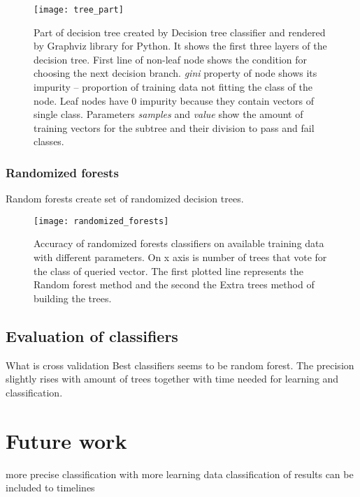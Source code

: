 \begin{figure}
  \centering
  \texttt{[image: tree\_part]}
  \caption{Part of decision tree created by Decision tree classifier and
    rendered by Graphviz library for Python. It shows the first three layers of the
    decision tree. First line of non-leaf node shows the condition for choosing
    the next decision branch. \emph{gini} property of node shows its impurity --
    proportion of training data not fitting the class of the node. Leaf nodes
    have 0 impurity because they contain vectors of single class. Parameters
    \emph{samples} and \emph{value} show the amount of training vectors for the
    subtree and their division to pass and fail classes.}
  \label{fig:knn}
\end{figure}

\subsection{Randomized forests}
Random forests create set of randomized decision trees.

\begin{figure}
  \centering
  \texttt{[image: randomized\_forests]}
  \caption{Accuracy of randomized forests classifiers on available training data
    with different parameters. On x axis is number of trees that vote for the
    class of queried vector. The first plotted line represents the Random forest
    method and the second the Extra trees method of building the trees.}
  \label{fig:knn}
\end{figure}

\section{Evaluation of classifiers}
What is cross validation
Best classifiers seems to be random forest.
The precision slightly rises with amount of trees together with time needed for
learning and classification.


\chapter{Future work}
more precise classification with more learning data
classification of results can be included to timelines

